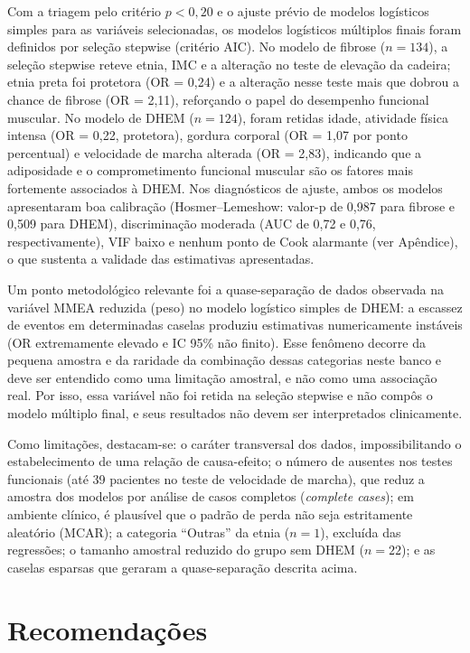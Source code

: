 \documentclass[11pt,a4paper]{article}
\begin{document}
Com a triagem pelo critério $p < 0{,}20$ e o ajuste prévio de modelos
logísticos simples para as variáveis selecionadas, os modelos logísticos
múltiplos finais foram definidos por seleção stepwise (critério AIC). No
modelo de fibrose ($n = 134$), a seleção stepwise reteve etnia, IMC e a
alteração no teste de elevação da cadeira; etnia preta foi protetora
(OR = 0,24) e a alteração nesse teste mais que dobrou a chance de fibrose
(OR = 2,11), reforçando o papel do desempenho funcional muscular. No modelo de
DHEM ($n = 124$), foram retidas idade, atividade física intensa (OR = 0,22,
protetora), gordura corporal (OR = 1,07 por ponto percentual) e velocidade de
marcha alterada (OR = 2,83), indicando que a adiposidade e o comprometimento
funcional muscular são os fatores mais fortemente associados à DHEM. Nos
diagnósticos de ajuste, ambos os modelos apresentaram boa calibração
(Hosmer--Lemeshow: valor-p de 0,987 para fibrose e 0,509 para DHEM),
discriminação moderada (AUC de 0,72 e 0,76, respectivamente), VIF baixo e
nenhum ponto de Cook alarmante (ver Apêndice), o que sustenta a validade das
estimativas apresentadas.

Um ponto metodológico relevante foi a quase-separação de dados observada na
variável MMEA reduzida (peso) no modelo logístico simples de DHEM: a escassez
de eventos em determinadas caselas produziu estimativas numericamente
instáveis (OR extremamente elevado e IC 95\% não finito). Esse fenômeno decorre
da pequena amostra e da raridade da combinação dessas categorias neste banco e
deve ser entendido como uma limitação amostral, e não como uma associação real.
Por isso, essa variável não foi retida na seleção stepwise e não compôs o
modelo múltiplo final, e seus resultados
não devem ser interpretados clinicamente.

Como limitações, destacam-se: o caráter transversal dos dados, impossibilitando
o estabelecimento de uma relação de causa-efeito; o número de ausentes nos
testes funcionais (até 39 pacientes no teste de velocidade de marcha), que
reduz a amostra dos modelos por análise de casos completos (\textit{complete
cases}); em ambiente clínico, é plausível que o padrão de perda não seja
estritamente aleatório (MCAR); a categoria ``Outras'' da etnia ($n = 1$),
excluída das regressões; o tamanho amostral reduzido do grupo sem DHEM
($n = 22$); e as caselas esparsas que geraram a quase-separação descrita acima.

\section{Recomendações}
\label{sec:recomendacoes}
\end{document}
